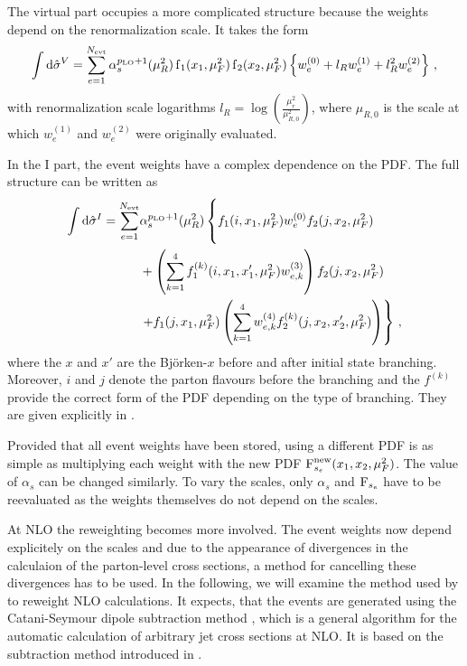 The virtual part occupies a more complicated structure because the weights depend on the renormalization scale.
It takes the form
%
\begin{equation}
	\int \dif \hat \sigma^V = \sum_{e=1}^{N_\text{evt}} \alpha_s^{p_\text{LO} + 1}(\mu_R^2) \pdf_1(x_1,\mu_F^2) \pdf_2(x_2,\mu_F^2) \left\{ w_e^{(0)} + l_R w_e^{(1)} + l_R^2 w_e^{(2)} \right\} \, ,
\end{equation}
%
with renormalization scale logarithms $l_R = \log\left(\frac{\mu_r^2}{\mu_{R,0}^2} \right)$, where $\mu_{R,0}$ is the scale at which $w_e^{(1)}$ and $w_e^{(2)}$ were originally evaluated.

In the I part, the event weights have a complex dependence on the PDF.
The full structure can be written as
%
\begin{align}
	\int \dif \hat \sigma^I = \sum_{e=1}^{N_\text{evt}} &\alpha_s^{p_\text{LO} + 1}(\mu_R^2) \left\{ \vphantom{\left( \sum_{k=1}^4 \right)} f_1(i,x_1,\mu_F^2) w_e^{(0)} f_2(j,x_2,\mu_F^2) \right. \nonumber \\
								&+ \left( \sum_{k=1}^4 f_1^{(k)}(i,x_1,x'_1,\mu_F^2) w_{e,k}^{(3)} \right) f_2(j,x_2,\mu_F^2) \nonumber \\
								&\left. + f_1(j,x_1,\mu_F^2) \left( \sum_{k=1}^4 w_{e,k}^{(4)} f_2^{(k)}(j,x_2,x'_2,\mu_F^2) \right) \right\} \, ,
\end{align}
%
where the $x$ and $x'$ are the Björken-$x$ before and after initial state branching.
Moreover, $i$ and $j$ denote the parton flavours before the branching and the $f^{(k)}$ provide the correct form of the PDF depending on the type of branching.
They are given explicitly in \cite{mcgrid2013}.

Provided that all event weights have been stored, using a different PDF is as simple as multiplying each weight with the new PDF $\operatorname{F}^\text{new}_{s_e}(x_1,x_2,\mu_F^2)$.
The value of $\alpha_s$ can be changed similarly.
To vary the scales, only $\alpha_s$ and $\operatorname{F}_{s_e}$ have to be reevaluated as the weights themselves do not depend on the scales.

At NLO the reweighting becomes more involved.
The event weights now depend explicitely on the scales and due to the appearance of divergences in the calculaion of the parton-level cross sections, a method for cancelling these divergences has to be used.
In the following, we will examine the method used by \mcgrid{} to reweight NLO calculations.
It expects, that the events are generated using the Catani-Seymour dipole subtraction method \cite{catani_seymour1997}, which is a general algorithm for the automatic calculation of arbitrary jet cross sections at NLO.
It is based on the subtraction method introduced in .

